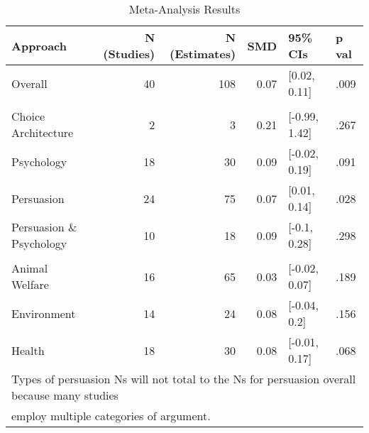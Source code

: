 \documentclass[sn-nature,referee,pdflatex]{sn-jnl}
\begin{document}
\begin{table}[!h]
\centering
\caption{\label{tab:table_one}Meta-Analysis Results}
\centering
\begin{tabular}[t]{lrrrll}
\toprule
Approach & N (Studies) & N (Estimates) & SMD & 95\% CIs & p val\\
\midrule
Overall & 40 & 108 & 0.07 & {}[0.02, 0.11] & .009\\
\addlinespace[0.5em]
\multicolumn{6}{l}{\textbf{Theory}}\\
\hspace{1em}Choice Architecture & 2 & 3 & 0.21 & {}[-0.99, 1.42] & .267\\
\hspace{1em}Psychology & 18 & 30 & 0.09 & {}[-0.02, 0.19] & .091\\
\hspace{1em}Persuasion & 24 & 75 & 0.07 & {}[0.01, 0.14] & .028\\
\hspace{1em}Persuasion \& Psychology & 10 & 18 & 0.09 & {}[-0.1, 0.28] & .298\\
\addlinespace[0.5em]
\multicolumn{6}{l}{\textbf{Type of Persuasion}}\\
\hspace{1em}Animal Welfare & 16 & 65 & 0.03 & {}[-0.02, 0.07] & .189\\
\hspace{1em}Environment & 14 & 24 & 0.08 & {}[-0.04, 0.2] & .156\\
\hspace{1em}Health & 18 & 30 & 0.08 & {}[-0.01, 0.17] & .068\\
\bottomrule
\multicolumn{6}{l}{\textsuperscript{} Types of persuasion Ns will not total to the Ns for persuasion overall because many studies}\\
\multicolumn{6}{l}{employ multiple categories of argument.}\\
\end{tabular}
\end{table}
\end{document}
